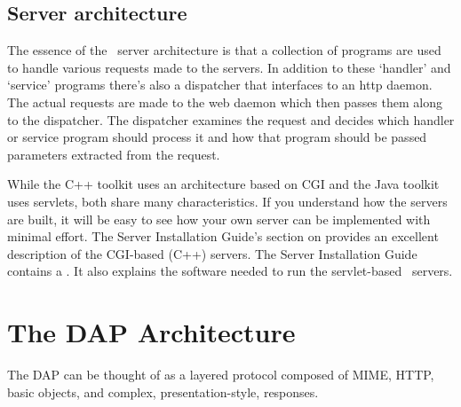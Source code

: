\documentclass{dods-paper}
\begin{document}

\subsection{Server architecture}

The essence of the \opendap\ server architecture is that a collection of
programs are used to handle various requests made to the servers. In
addition to these `handler' and `service' programs there's also a
dispatcher that interfaces to an http daemon. The actual requests are
made to the web daemon which then passes them along to the dispatcher.
The dispatcher examines the request and decides which handler or
service program should process it and how that program should be
passed parameters extracted from the request.


While the C++ toolkit uses an architecture based on CGI and the Java toolkit
uses servlets, both share many characteristics. If you understand how the
servers are built, it will be easy to see how your own server can be
implemented with minimal effort. The Server Installation Guide's section on
 provides an
excellent description of the CGI-based (C++) servers. The Server Installation
Guide contains a .  It also explains the software
needed to run the servlet-based \opendap\ servers.

\section{The DAP Architecture}

The DAP can be thought of as a layered protocol composed of MIME, HTTP, basic
objects, and complex, presentation-style, responses.
\end{document}
